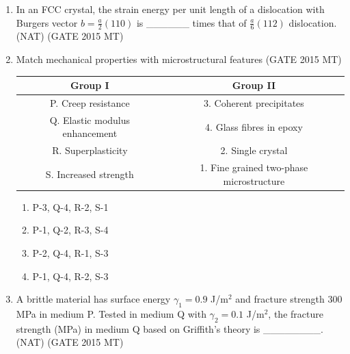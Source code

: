 \documentclass[12pt]{article}
\begin{document}
\begin{enumerate}
\item In an FCC crystal, the strain energy per unit length of a dislocation with Burgers vector $b = \frac{a}{2} (110)$ is ______ times that of $\frac{a}{6} (112)$ dislocation. (NAT) (GATE 2015 MT)

\item Match mechanical properties with microstructural features (GATE 2015 MT)
\begin{table}[h]
\centering
\begin{tabular}{|c|c|}
\hline
Group I & Group II \\
\hline
P. Creep resistance & 3. Coherent precipitates \\
Q. Elastic modulus enhancement & 4. Glass fibres in epoxy \\
R. Superplasticity & 2. Single crystal \\
S. Increased strength & 1. Fine grained two-phase microstructure \\
\hline
\end{tabular}
\end{table}
\begin{enumerate}[label=(\alph*)]
  \item P-3, Q-4, R-2, S-1
  \item P-1, Q-2, R-3, S-4
  \item P-2, Q-4, R-1, S-3
  \item P-1, Q-4, R-2, S-3
\end{enumerate}

\item A brittle material has surface energy $\gamma_1 = 0.9$ J/m$^2$ and fracture strength 300 MPa in medium P. Tested in medium Q with $\gamma_2 = 0.1$ J/m$^2$, the fracture strength (MPa) in medium Q based on Griffith’s theory is ________. (NAT) (GATE 2015 MT)

\end{enumerate}
\end{document}
